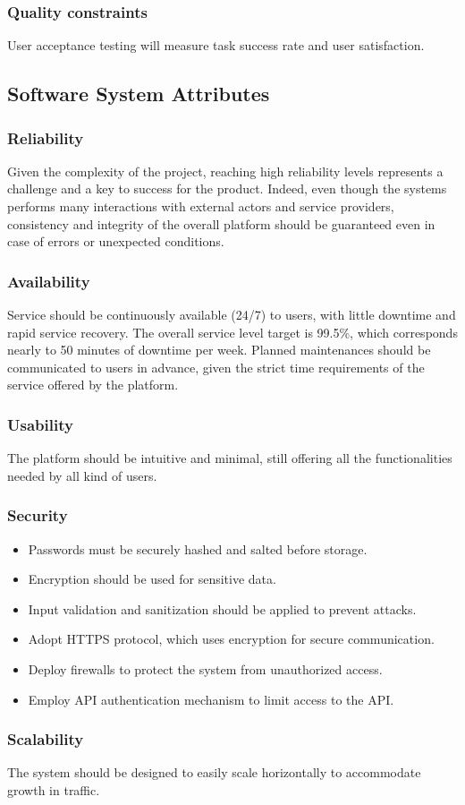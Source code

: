 \subsubsection{Quality constraints}
User acceptance testing will measure task success rate and user satisfaction.

\subsection{Software System Attributes}
\subsubsection{Reliability}
Given the complexity of the project, reaching high reliability levels represents a challenge and a key to success for the product. Indeed, even though the systems performs many interactions with external actors and service providers, consistency and integrity of the overall platform should be guaranteed even in case of errors or unexpected conditions.
\subsubsection{Availability}
Service should be continuously available (24/7) to users, with little downtime and rapid service recovery. The overall service level target is 99.5\%, which corresponds nearly to 50 minutes of downtime per week. Planned maintenances should be communicated to users in advance, given the strict time requirements of the service offered by the platform.
\subsubsection{Usability}
The platform should be intuitive and minimal, still offering all the functionalities needed by all kind of users.
\subsubsection{Security}
\begin{itemize}
    \item Passwords must be securely hashed and salted before storage.
    \item Encryption should be used for sensitive data.
    \item Input validation and sanitization should be applied to prevent attacks.
    \item Adopt HTTPS protocol, which uses encryption for secure communication.
    \item Deploy firewalls to protect the system from unauthorized access.
    \item Employ API authentication mechanism to limit access to the API.
\end{itemize}
\subsubsection{Scalability}
The system should be designed to easily scale horizontally to accommodate growth in traffic.
